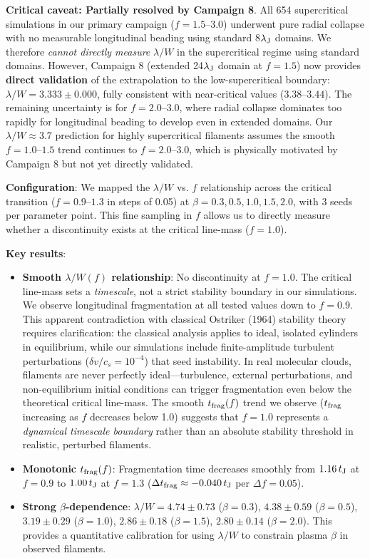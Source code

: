 \documentclass[twoside,twocolumn]{mnras}
\begin{document}
\textbf{Critical caveat: Partially resolved by Campaign 8}. All 654 supercritical simulations in our primary campaign ($f = 1.5$--$3.0$) underwent pure radial collapse with no measurable longitudinal beading using standard 8$\lambda_{\rm J}$ domains. We therefore \textit{cannot directly measure} $\lambda/W$ in the supercritical regime using standard domains. However, Campaign 8 (extended 24$\lambda_{\rm J}$ domain at $f = 1.5$) now provides \textbf{direct validation} of the extrapolation to the low-supercritical boundary: $\lambda/W = 3.333 \pm 0.000$, fully consistent with near-critical values (3.38--$3.44$). The remaining uncertainty is for $f = 2.0$--$3.0$, where radial collapse dominates too rapidly for longitudinal beading to develop even in extended domains. Our $\lambda/W \approx 3.7$ prediction for highly supercritical filaments assumes the smooth $f = 1.0$--$1.5$ trend continues to $f = 2.0$--$3.0$, which is physically motivated by Campaign 8 but not yet directly validated.

\textbf{Configuration}: We mapped the $\lambda/W$ vs. $f$ relationship across the critical transition ($f = 0.9$--$1.3$ in steps of 0.05) at $\beta = 0.3, 0.5, 1.0, 1.5, 2.0$, with 3 seeds per parameter point. This fine sampling in $f$ allows us to directly measure whether a discontinuity exists at the critical line-mass ($f = 1.0$).

\textbf{Key results}:
\begin{itemize}
    \item \textbf{Smooth $\lambda/W(f)$ relationship}: No discontinuity at $f = 1.0$. The critical line-mass sets a \textit{timescale}, not a strict stability boundary in our simulations. We observe longitudinal fragmentation at all tested values down to $f = 0.9$. This apparent contradiction with classical Ostriker (1964) stability theory requires clarification: the classical analysis applies to ideal, isolated cylinders in equilibrium, while our simulations include finite-amplitude turbulent perturbations ($\delta v/c_s = 10^{-4}$) that seed instability. In real molecular clouds, filaments are never perfectly ideal---turbulence, external perturbations, and non-equilibrium initial conditions can trigger fragmentation even below the theoretical critical line-mass. The smooth $t_{\rm frag}(f)$ trend we observe ($t_{\rm frag}$ increasing as $f$ decreases below 1.0) suggests that $f = 1.0$ represents a \textit{dynamical timescale boundary} rather than an absolute stability threshold in realistic, perturbed filaments.
    \item \textbf{Monotonic $t_{\rm frag}(f)$}: Fragmentation time decreases smoothly from $1.16\,t_{\rm J}$ at $f = 0.9$ to $1.00\,t_{\rm J}$ at $f = 1.3$ ($\Delta t_{\rm frag} \approx -0.040\,t_{\rm J}$ per $\Delta f = 0.05$).
    \item \textbf{Strong $\beta$-dependence}: $\lambda/W = 4.74 \pm 0.73$ ($\beta = 0.3$), $4.38 \pm 0.59$ ($\beta = 0.5$), $3.19 \pm 0.29$ ($\beta = 1.0$), $2.86 \pm 0.18$ ($\beta = 1.5$), $2.80 \pm 0.14$ ($\beta = 2.0$). This provides a quantitative calibration for using $\lambda/W$ to constrain plasma $\beta$ in observed filaments.
\end{itemize}
\end{document}
